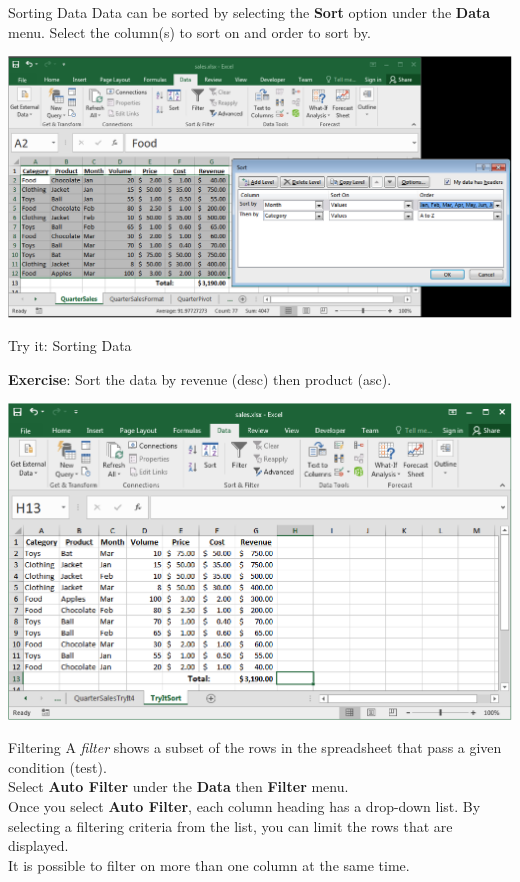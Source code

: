 \documentclass[xcolor=svgnames]{beamer}
\begin{document}
\begin{frame}{Sorting Data}
Data can be sorted by selecting the {\bf Sort} option under the {\bf Data} menu.  Select the column(s) to sort on and order to sort by.
\begin{center}
 \includegraphics[width=.99\textwidth]{Sorting}
\end{center}
\end{frame}

\begin{frame}{Try it: Sorting Data}
  \begin{exampleblock}{}{}
{\bf Exercise}: Sort the data by revenue (desc) then product (asc).
  \end{exampleblock}
\begin{center}
 \includegraphics[width=.9\textwidth]{SortQ}
\end{center}
\end{frame}

\begin{frame}{Filtering}
A \emph{filter} shows a subset of the rows in the spreadsheet that pass a given condition (test).\\[1em] 
Select {\bf Auto Filter} under the {\bf Data} then {\bf Filter} menu.\\[1em] 
Once you select {\bf Auto Filter}, each column heading has a drop-down list.  By selecting a filtering criteria from the list, you can limit the rows that are displayed.\\[1em] 
It is possible to filter on more than one column at the same time.
\end{frame}
\end{document}
